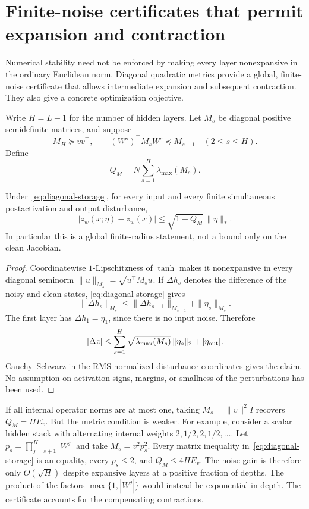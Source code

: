 \section{Finite-noise certificates that permit expansion and contraction}
\label{sec:numeric-certificates}

Numerical stability need not be enforced by making every layer nonexpansive
in the ordinary Euclidean norm. Diagonal quadratic metrics provide a
global, finite-noise certificate that allows intermediate expansion and
subsequent contraction. They also give a concrete optimization objective.

Write $H=L-1$ for the number of hidden layers. Let $M_s$ be diagonal
positive semidefinite matrices, and suppose
\begin{equation}\label{eq:diagonal-storage}
 M_H\succeq vv^\top,\qquad
 (W^s)^\top M_sW^s\preceq M_{s-1}\quad(2\le s\le H).
\end{equation}
Define
\[
 Q_M=N\sum_{s=1}^H\lambda_{\max}(M_s).
\]

\begin{proposition}
\label{prop:diagonal-numeric}
Under~\eqref{eq:diagonal-storage}, for every input and every finite
simultaneous postactivation and output disturbance,
\[
 |z_w(x;\eta)-z_w(x)|\le\sqrt{1+Q_M}\,\|\eta\|_*.
\]
In particular this is a global finite-radius statement, not a bound only
on the clean Jacobian.
\end{proposition}
\begin{proof}
Coordinatewise $1$-Lipschitzness of $\tanh$ makes it nonexpansive in every
diagonal seminorm $\|u\|_{M_s}=\sqrt{u^\top M_su}$.
If $\Delta h_s$ denotes the difference of the noisy and clean states,
\eqref{eq:diagonal-storage} gives
\[
 \|\Delta h_s\|_{M_s}
 \le\|\Delta h_{s-1}\|_{M_{s-1}}+\|\eta_s\|_{M_s}.
\]
The first layer has $\Delta h_1=\eta_1$, since there is no input noise.
Therefore
\[
 |\Delta z|\le
   \sum_{s=1}^H\sqrt{\lambda_{\max}(M_s)}\,\|\eta_s\|_2
       +|\eta_{\rm out}|.
\]
Cauchy--Schwarz in the RMS-normalized disturbance coordinates gives the
claim. No assumption on activation signs, margins, or smallness of the
perturbations has been used.
\end{proof}

If all internal operator norms are at most one, taking
$M_s=\|v\|^2I$ recovers $Q_M=H E_v$. But the metric condition is weaker.
For example, consider a scalar hidden stack with alternating internal
weights $2,1/2,2,1/2,\ldots$. Let
$p_s=\prod_{j=s+1}^H|W^j|$ and take $M_s=v^2p_s^2$.
Every matrix inequality in~\eqref{eq:diagonal-storage} is an equality,
every $p_s\le2$, and $Q_M\le4H E_v$. The noise gain is therefore only
$O(\sqrt H)$ despite expansive layers at a positive fraction of depths.
The product of the factors $\max\{1,|W^j|\}$ would instead be exponential
in depth. The certificate accounts for the compensating contractions.

